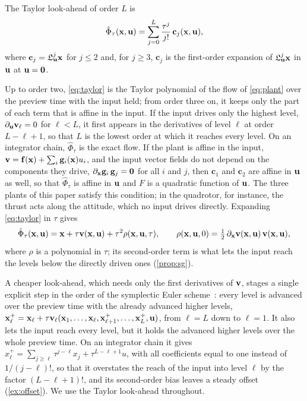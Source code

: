 \begin{definition}\label{def:taylor}
The Taylor look-ahead of order $L$ is
\begin{equation}\label{eq:taylor}
    \hat\Phi_\tau(\mathbf{x},\mathbf{u}) = \sum_{j=0}^{L}\frac{\tau^j}{j!}\,\mathbf{c}_j(\mathbf{x},\mathbf{u}),
\end{equation}
where $\mathbf{c}_j = \mathfrak{L}_{\mathbf{u}}^j\mathbf{x}$ for $j \le 2$ and, for $j \ge 3$, $\mathbf{c}_j$ is the
first-order expansion of $\mathfrak{L}_{\mathbf{u}}^j\mathbf{x}$ in $\mathbf{u}$ at $\mathbf{u} = \mathbf{0}$.
\end{definition}

Up to order two, \eqref{eq:taylor} is the Taylor polynomial of the flow of \eqref{eq:plant} over the
preview time with the input held; from order three on, it keeps only the part of each term that is
affine in the input.
If the input drives only the highest level, $\partial_{\mathbf{u}}\mathbf{v}_\ell = 0$ for $\ell < L$, it first
appears in the derivatives of level $\ell$ at order $L - \ell + 1$, so that $L$ is the lowest order at
which it reaches every level.
On an integrator chain, $\hat\Phi_\tau$ is the exact flow.
If the plant is affine in the input, $\mathbf{v} = \mathbf{f}(\mathbf{x}) + \sum_i \mathbf{g}_i(\mathbf{x})u_i$, and the input
vector fields do not depend on the components they drive, $\partial_{\mathbf{x}}\mathbf{g}_i\,\mathbf{g}_j =
\mathbf{0}$ for all $i$ and $j$, then $\mathbf{c}_1$ and $\mathbf{c}_2$ are affine in $\mathbf{u}$ as well, so
that $\hat\Phi_\tau$ is affine in $\mathbf{u}$ and $F$ is a quadratic function of $\mathbf{u}$.
The three plants of this paper satisfy this condition; in the quadrotor, for instance, the thrust
acts along the attitude, which no input drives directly.
Expanding \eqref{eq:taylor} in $\tau$ gives
\begin{equation}\label{eq:taylor-expansion}
    \hat\Phi_\tau(\mathbf{x},\mathbf{u}) = \mathbf{x} + \tau\mathbf{v}(\mathbf{x},\mathbf{u}) + \tau^2\rho(\mathbf{x},\mathbf{u},\tau), \qquad
    \rho(\mathbf{x},\mathbf{u},0) = \tfrac12\,\partial_{\mathbf{x}}\mathbf{v}(\mathbf{x},\mathbf{u})\,\mathbf{v}(\mathbf{x},\mathbf{u}),
\end{equation}
where $\rho$ is a polynomial in $\tau$; its second-order term is what lets the input reach the levels
below the directly driven ones (\cref{prop:sg}).

\begin{remark}\label{rem:staged}
A cheaper look-ahead, which needs only the first derivatives of $\mathbf{v}$, stages a single explicit step
in the order of the symplectic Euler scheme~\citep{hairer2006geometric}: every level is advanced over
the preview time with the already advanced higher levels,
$\mathbf{x}_\ell^+ = \mathbf{x}_\ell + \tau\mathbf{v}_\ell(\mathbf{x}_1,\dots,\mathbf{x}_\ell,\mathbf{x}_{\ell+1}^+,\dots,\mathbf{x}_L^+,\mathbf{u})$, from
$\ell = L$ down to $\ell = 1$.
It also lets the input reach every level, but it holds the advanced higher levels over the whole
preview time.
On an integrator chain it gives $x_\ell^+ = \sum_{j\ge\ell}\tau^{j-\ell}x_j + \tau^{L-\ell+1}u$, with
all coefficients equal to one instead of $1/(j - \ell)!$, so that it overstates the reach of the input
into level $\ell$ by the factor $(L - \ell + 1)!$, and its second-order bias leaves a steady offset
(\cref{ex:offset}).
We use the Taylor look-ahead throughout.
\end{remark}

